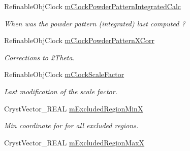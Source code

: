 \begin{DoxyCompactItemize}
\mbox{\label{class_obj_cryst_1_1_powder_pattern_a8eae5432b9c084a5416ecc46330faaf7}} 
Refinable\+Obj\+Clock \mbox{\hyperlink{class_obj_cryst_1_1_powder_pattern_a8eae5432b9c084a5416ecc46330faaf7}{m\+Clock\+Powder\+Pattern\+Integrated\+Calc}}
\begin{DoxyCompactList}\small\item\em When was the powder pattern (integrated) last computed ? \end{DoxyCompactList}\item 
\mbox{\label{class_obj_cryst_1_1_powder_pattern_ae1e38d5d59428ee4658f7bf8e49416a3}} 
Refinable\+Obj\+Clock \mbox{\hyperlink{class_obj_cryst_1_1_powder_pattern_ae1e38d5d59428ee4658f7bf8e49416a3}{m\+Clock\+Powder\+Pattern\+X\+Corr}}
\begin{DoxyCompactList}\small\item\em Corrections to 2Theta. \end{DoxyCompactList}\item 
\mbox{\label{class_obj_cryst_1_1_powder_pattern_abcd57fa3c97fd3434daa137a619b65e2}} 
Refinable\+Obj\+Clock \mbox{\hyperlink{class_obj_cryst_1_1_powder_pattern_abcd57fa3c97fd3434daa137a619b65e2}{m\+Clock\+Scale\+Factor}}
\begin{DoxyCompactList}\small\item\em Last modification of the scale factor. \end{DoxyCompactList}\item 
\mbox{\label{class_obj_cryst_1_1_powder_pattern_a65c938b76b08552e2147135aa269dd8e}} 
Cryst\+Vector\+\_\+\+R\+E\+AL \mbox{\hyperlink{class_obj_cryst_1_1_powder_pattern_a65c938b76b08552e2147135aa269dd8e}{m\+Excluded\+Region\+MinX}}
\begin{DoxyCompactList}\small\item\em Min coordinate for for all excluded regions. \end{DoxyCompactList}\item 
\mbox{\label{class_obj_cryst_1_1_powder_pattern_a77a9cb2e80edd777eac9b56fe68e95ef}} 
Cryst\+Vector\+\_\+\+R\+E\+AL \mbox{\hyperlink{class_obj_cryst_1_1_powder_pattern_a77a9cb2e80edd777eac9b56fe68e95ef}{m\+Excluded\+Region\+MaxX}}

\end{DoxyCompactItemize}
